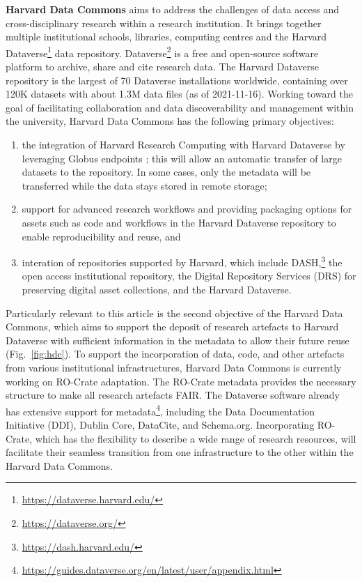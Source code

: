\documentclass[ds,v1.1.2,openaccess]{iosart2x}%
\begin{document}
\textbf{Harvard Data Commons} \cite{doi:10.7557/5.5422} aims to address the
challenges of data access and cross-disciplinary research within a
research institution. It brings together multiple institutional
schools, libraries, computing centres and the Harvard
Dataverse\footnote{\url{https://dataverse.harvard.edu/}} data repository.
Dataverse\footnote{\url{https://dataverse.org/}} \cite{doi:10.1045/january2011-crosas}
is a free and open-source software platform to archive, share and cite
research data. The Harvard Dataverse repository is the largest of 70
Dataverse installations worldwide, containing over 120K datasets with
about 1.3M data files (as of 2021-11-16). Working toward the goal of
facilitating collaboration and data discoverability and management
within the university, Harvard Data Commons has the following primary
objectives:
\begin{enumerate}
\item[1.] the integration of Harvard Research Computing with Harvard Dataverse
by leveraging Globus endpoints \cite{doi:10.1109/MCC.2014.52}; this will
allow an automatic transfer of large datasets to the repository. In
some cases, only the metadata will be transferred while the data stays
stored in remote storage;
\item[2.] support for advanced research workflows and providing packaging
options for assets such as code and workflows in the Harvard Dataverse
repository to enable reproducibility and reuse, and
\item[3.] interation of repositories supported by Harvard, which include
DASH,\footnote{\url{https://dash.harvard.edu/}} the open access institutional
repository, the Digital Repository Services (DRS) for preserving
digital asset collections, and the Harvard Dataverse.
\end{enumerate}

Particularly relevant to this article is the second objective of the
Harvard Data Commons, which aims to support the deposit of research
artefacts to Harvard Dataverse with sufficient information in the
metadata to allow their future reuse (Fig.~\ref{fig:hdc}). To support
the incorporation of data, code, and other artefacts from various
institutional infrastructures, Harvard Data Commons is currently
working on RO-Crate adaptation. The RO-Crate metadata provides the
necessary structure to make all research artefacts FAIR. The Dataverse
software already has extensive support for metadata\footnote{\url{https://guides.dataverse.org/en/latest/user/appendix.html}}, including the Data
Documentation Initiative (DDI), Dublin Core, DataCite, and Schema.org.
Incorporating RO-Crate, which has the flexibility to describe a wide
range of research resources, will facilitate their seamless transition
from one infrastructure to the other within the Harvard Data Commons.
\end{document}

